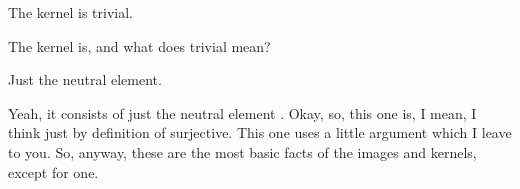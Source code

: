 \begin{student}
The kernel is trivial.
\end{student}

\begin{speech}[00:45:35 - 00:45:37]
The kernel is, and what does trivial mean?
\end{speech}

\begin{student}
Just the neutral element.
\end{student}

\begin{speech}[00:45:38 - 00:45:54]
Yeah, it consists of just the neutral element . Okay, so, this one is, I mean, I think just by definition of surjective. This one uses a little argument which I leave to you. So, anyway, these are the most basic facts of the images and kernels, except for one.
\end{speech}

